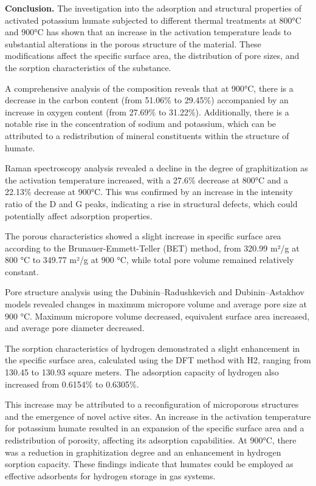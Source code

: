 {\bfseries Conclusion.} The investigation into the adsorption and
structural properties of activated potassium humate subjected to
different thermal treatments at 800°C and 900°C has shown that an
increase in the activation temperature leads to substantial alterations
in the porous structure of the material. These modifications affect the
specific surface area, the distribution of pore sizes, and the sorption
characteristics of the substance.

A comprehensive analysis of the composition reveals that at 900°C, there
is a decrease in the carbon content (from 51.06\% to 29.45\%)
accompanied by an increase in oxygen content (from 27.69\% to 31.22\%).
Additionally, there is a notable rise in the concentration of sodium and
potassium, which can be attributed to a redistribution of mineral
constituents within the structure of humate.

Raman spectroscopy analysis revealed a decline in the degree of
graphitization as the activation temperature increased, with a 27.6\%
decrease at 800°C and a 22.13\% decrease at 900°C. This was confirmed by
an increase in the intensity ratio of the D and G peaks, indicating a
rise in structural defects, which could potentially affect adsorption
properties.

The porous characteristics showed a slight increase in specific surface
area according to the Brunauer-Emmett-Teller (BET) method, from 320.99
m²/g at 800 °C to 349.77 m²/g at 900 °C, while total pore volume
remained relatively constant.

Pore structure analysis using the Dubinin--Radushkevich and
Dubinin--Astakhov models revealed changes in maximum micropore volume
and average pore size at 900 °C. Maximum micropore volume decreased,
equivalent surface area increased, and average pore diameter decreased.

The sorption characteristics of hydrogen demonstrated a slight
enhancement in the specific surface area, calculated using the DFT
method with H2, ranging from 130.45 to 130.93 square meters. The
adsorption capacity of hydrogen also increased from 0.6154\% to
0.6305\%.

This increase may be attributed to a reconfiguration of microporous
structures and the emergence of novel active sites. An increase in the
activation temperature for potassium humate resulted in an expansion of
the specific surface area and a redistribution of porosity, affecting
its adsorption capabilities. At 900°C, there was a reduction in
graphitization degree and an enhancement in hydrogen sorption capacity.
These findings indicate that humates could be employed as effective
adsorbents for hydrogen storage in gas systems.

